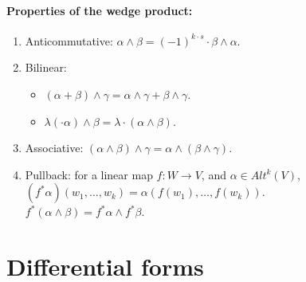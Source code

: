 \documentclass[11pt]{book} %
\begin{document}
\paragraph{Properties of the wedge product:}
\begin{enumerate}
    \item Anticommutative: $\alpha \wedge \beta = (-1)^{k \cdot s} \cdot \beta \wedge \alpha$.
    \item Bilinear:
        \begin{itemize}
            \item $(\alpha + \beta) \wedge \gamma = \alpha \wedge \gamma + \beta \wedge \gamma$.
            \item $\lambda (\cdot \alpha) \wedge \beta = \lambda \cdot (\alpha \wedge \beta)$.
        \end{itemize}
    \item Associative: $(\alpha \wedge \beta) \wedge \gamma = \alpha \wedge (\beta \wedge \gamma)$.
    \item Pullback: for a linear map $f : W \to V$, and $\alpha \in Alt^k(V)$, $(f^* \alpha)(w_1, \ldots, w_k) = \alpha(f(w_1), \ldots, f(w_k))$. \\
        $f^*(\alpha \wedge \beta) = f^* \alpha \wedge f^* \beta$.
\end{enumerate}



\section{Differential forms}




\end{document}
